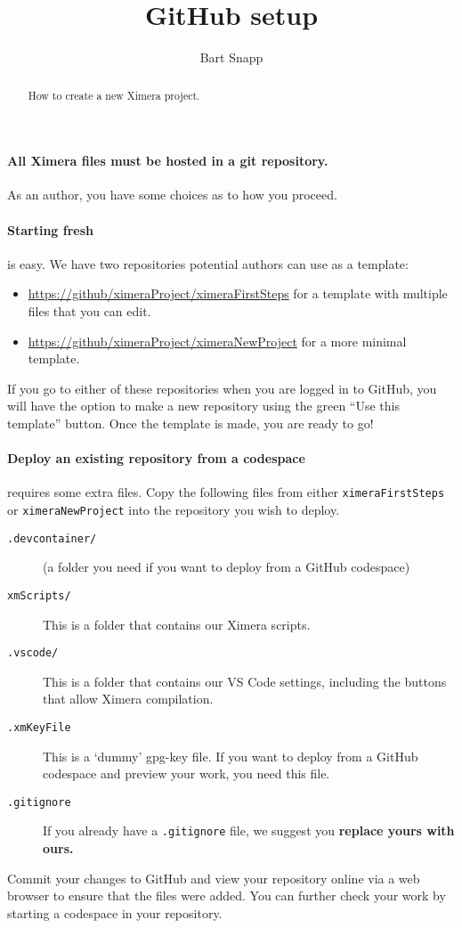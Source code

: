 \documentclass{ximera}
\title{GitHub setup}
\author{Bart Snapp}
\begin{document}
\begin{abstract}
    How to create a new Ximera project.
\end{abstract}
\maketitle

\paragraph{All Ximera files must be hosted in a git repository.}
As an author, you have some choices as to how you proceed.

\paragraph{Starting fresh} is easy.
We have two repositories potential authors can use as a template:
\begin{itemize}
    \item \url{https://github/ximeraProject/ximeraFirstSteps} for a template
          with multiple files that you can edit.
    \item \url{https://github/ximeraProject/ximeraNewProject} for a more
          minimal template.
\end{itemize}
If you go to either of these repositories when you are logged in to GitHub, you
will have the option to make a new repository using the green ``Use this
template'' button. Once the template is made, you are ready to go!

\paragraph{Deploy an existing repository from a codespace} requires some
extra files. Copy the
following files from either \verb!ximeraFirstSteps! or \verb!ximeraNewProject!
into the repository you wish to deploy.
\begin{description}
    \item[\texttt{.devcontainer/}] (a folder you need if you want to deploy from
          a
          GitHub codespace)
    \item[\texttt{xmScripts/}] This is a folder that contains our Ximera
        scripts.
    \item[\texttt{.vscode/}] This is a folder that contains our VS Code
        settings, including the buttons that allow Ximera compilation.
    \item[\texttt{.xmKeyFile}] This is a `dummy' gpg-key file. If you want to
        deploy from a GitHub codespace and preview your work, you need this
        file.
    \item[\texttt{.gitignore}]	If you already have a \verb|.gitignore| file,
        we suggest
        you \textbf{replace yours with ours.}
\end{description}
Commit your changes to GitHub and view your repository online via a web browser
to ensure that the files were added.
You can further check your work by starting a codespace in your repository.
\end{document}
